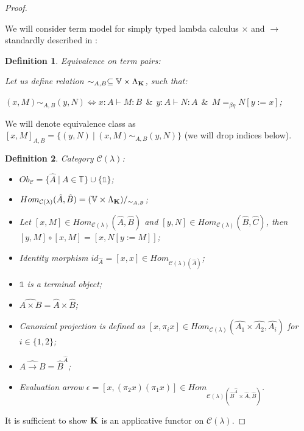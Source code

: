 \documentclass[a4paper]{article}
\newtheorem{defin}{Definition}
\begin{document}
\begin{proof}

$ $

We will consider term model for simply typed lambda calculus $\times$ and $\to$ standardly described in \cite{LambekScott}:

\begin{defin} Equivalence on term pairs:
  $ $

  Let us define relation $\sim_{A, B} \subseteq \mathbb{V} \times \Lambda_{{\bf K}}$, such that:

  $(x, M) \sim_{A, B} (y, N) \Leftrightarrow x : A \vdash M : B \:\: \& \:\: y : A \vdash N : A \:\: \& \:\: M =_{\beta \eta} N [y := x]$;
\end{defin}

We will denote equivalence class as $[x, M]_{A, B} = \{ (y, N) \: | \: (x, M) \sim_{A, B} (y, N) \}$ (we will drop indices below).


\begin{defin} Category $\mathcal{C}(\lambda)$:
\begin{itemize}
  \item $Ob_{\mathcal{C}} = \{ \hat{A} \: | \: A \in \mathbb{T} \} \cup \{ \mathds{1} \}$;
  \item $Hom_{\mathcal{C}(\lambda)}(\hat{A},\hat{B}) = (\mathbb{V} \times \Lambda_{{\bf K}})/_{\sim_{A, B}}$;
  \item Let $[x, M] \in Hom_{\mathcal{C}(\lambda)}(\hat{A},\hat{B})$ and $[y,N] \in Hom_{\mathcal{C}(\lambda)}(\hat{B},\hat{C})$, then $[y,M] \circ [x, M] = [x, N [y := M]]$;
  \item Identity morphism $id_{\hat{A}} = [x,x] \in Hom_{\mathcal{C}(\lambda)(\hat{A})}$;
  \item $\mathds{1}$ is a terminal object;
  \item $\widehat{A \times B} = \hat{A} \times \hat{B}$;
  \item Canonical projection is defined as $[x, \pi_i x] \in Hom_{\mathcal{C}(\lambda)}(\hat{A_1} \times \hat{A_2},\hat{A_i})$ for $i \in \{ 1, 2 \}$;
  \item $\widehat{A \to B} = \hat{B}^{\hat{A}}$;
  \item Evaluation arrow $\epsilon = [x, (\pi_2 x) (\pi_1 x)] \in Hom_{\mathcal{C}(\lambda)(\hat{B}^{\hat{A}} \times \hat{A}, \hat{B})}$.
\end{itemize}
\end{defin}

It is sufficient to show ${\bf K}$ is an applicative functor on $\mathcal{C}(\lambda)$.


\end{proof}
\end{document}
